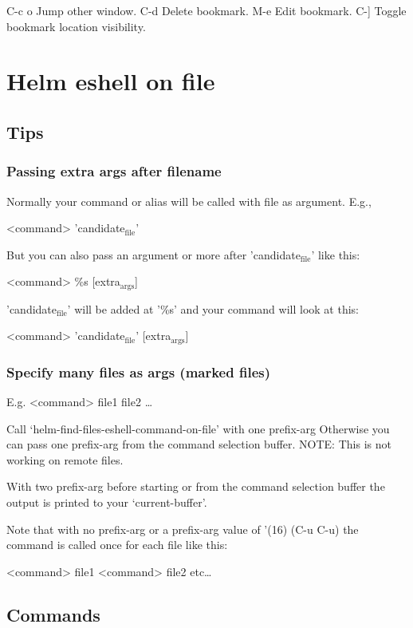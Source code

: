 \documentclass[11pt]{article}
\begin{document}
C-c o		Jump other window.
C-d		Delete bookmark.
M-e		Edit bookmark.
C-]		Toggle bookmark location visibility.

\section{Helm eshell on file}
\label{sec:org69a0aaf}

\subsection{Tips}
\label{sec:org9733f46}

\subsubsection{Passing extra args after filename}
\label{sec:orgc10c3b1}

Normally your command or alias will be called with file as argument. E.g.,

<command> ’candidate\(_{\text{file}}\)’

But you can also pass an argument or more after ’candidate\(_{\text{file}}\)’ like this:

<command> \%s [extra\(_{\text{args}}\)]

’candidate\(_{\text{file}}\)’ will be added at ’\%s’ and your command will look at this:

<command> ’candidate\(_{\text{file}}\)’ [extra\(_{\text{args}}\)]

\subsubsection{Specify many files as args (marked files)}
\label{sec:org4c1f52d}

E.g. <command> file1 file2 \ldots{}

Call ‘helm-find-files-eshell-command-on-file’ with one prefix-arg
Otherwise you can pass one prefix-arg from the command selection buffer.
NOTE: This is not working on remote files.

With two prefix-arg before starting or from the command selection buffer
the output is printed to your ‘current-buffer’.

Note that with no prefix-arg or a prefix-arg value of ’(16) (C-u C-u)
the command is called once for each file like this:

<command> file1 <command> file2 etc\ldots{}

\subsection{Commands}
\label{sec:org914973e}
\end{document}
